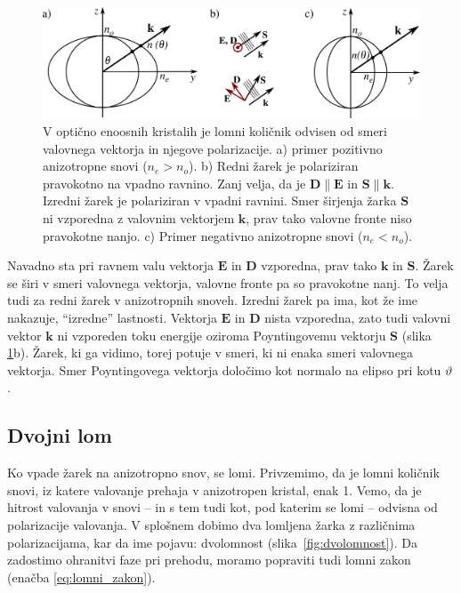 \begin{figure}[h]
\centering
\includegraphics[width=12truecm]{slike/01_elipsa.png}
\caption{\label{fig:Elipsa}V optično enoosnih kristalih je lomni količnik odvisen
od smeri valovnega vektorja in njegove polarizacije. a) primer pozitivno anizotropne
snovi ($n_e>n_o$). b) Redni žarek je polariziran pravokotno na vpadno ravnino. Zanj velja, 
da je $\mathbf{D} \parallel \mathbf{E}$ in $\mathbf{S} \parallel \mathbf{k}$. Izredni žarek
je polariziran v vpadni ravnini. Smer širjenja žarka $\mathbf{S}$ ni vzporedna z valovnim vektorjem
$\mathbf{k}$,
prav tako valovne fronte niso pravokotne nanjo. c) Primer negativno anizotropne snovi ($n_e< n_o$).}
\end{figure}


Navadno sta pri ravnem valu vektorja $\mathbf{E}$ in $\mathbf{D}$ vzporedna, 
prav tako $\mathbf{k}$ in $\mathbf{S}$. Žarek se širi v smeri valovnega vektorja, 
valovne fronte pa so pravokotne nanj. To velja tudi za redni žarek v anizotropnih
snoveh. Izredni žarek pa ima, kot že ime nakazuje, ``izredne'' lastnosti. Vektorja
$\mathbf{E}$ in $\mathbf{D}$ nista vzporedna, zato tudi valovni vektor $\mathbf{k}$ ni vzporeden
toku energije oziroma Poyntingovemu vektorju $\mathbf{S}$ (slika \ref{fig:Elipsa}b). 
Žarek, ki ga vidimo, torej potuje v smeri, ki ni enaka smeri valovnega vektorja. Smer
Poyntingovega vektorja določimo kot normalo na elipso pri kotu $\vartheta$. 

\subsection*{Dvojni lom}
Ko vpade žarek na anizotropno snov, se lomi. Privzemimo, da je lomni količnik snovi,
iz katere valovanje prehaja v anizotropen kristal, enak 1. Vemo, da je hitrost valovanja v 
snovi -- in s tem tudi kot, pod katerim se lomi -- odvisna od polarizacije valovanja. V splošnem
dobimo dva lomljena žarka z različnima polarizacijama, kar
da ime pojavu: dvolomnost (slika~\ref{fig:dvolomnost}). 
Da zadostimo ohranitvi faze
pri prehodu, moramo popraviti tudi lomni zakon (enačba \ref{eq:lomni_zakon}).


